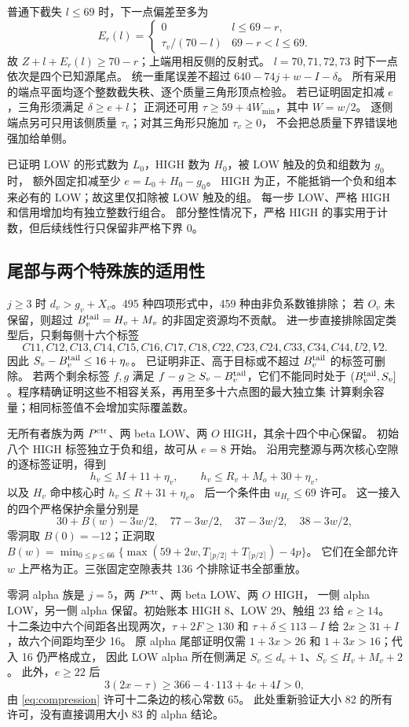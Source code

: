 \documentclass[11pt,a4paper]{article}
\begin{document}
普通下截失 $l\le69$ 时，下一点偏差至多为
\[
 E_r(l)=\begin{cases}0&l\le69-r,\\\tau_v/(70-l)&69-r<l\le69.\end{cases}
\]
故 $Z+l+E_r(l)\ge70-r$；上端用相反侧的反射式。
$l=70,71,72,73$ 时下一点依次是四个已知源尾点。
统一重尾误差不超过 $640-74j+w-I-\delta$。
所有采用的端点平面均逐个整数截失秩、逐个质量三角形顶点检验。
若已证明固定扣减 $e$，三角形须满足 $\delta\ge e+l$；
正洞还可用 $\tau\ge59+4W_{\min}$，其中 $W=w/2$。
逐侧端点另可只用该侧质量 $\tau_v$；对其三角形只施加 $\tau_v\ge0$，
不会把总质量下界错误地强加给单侧。

已证明 LOW 的形式数为 $L_0$，HIGH 数为 $H_0$，被 LOW 触及的负和组数为 $g_0$ 时，
额外固定扣减至少 $e=L_0+H_0-g_0$。
HIGH 为正，不能抵销一个负和组本来必有的 LOW；故这里仅扣除被 LOW 触及的组。
每一步 LOW、严格 HIGH 和信用增加均有独立整数行组合。
部分整性情况下，严格 HIGH 的事实用于计数，但后续线性行只保留非严格下界 0。

\subsection{尾部与两个特殊族的适用性}
$j\ge3$ 时 $d_v>g_v+X_v$。495 种四项形式中，459 种由非负系数锥排除；
若 $O_v$ 未保留，则超过 $B_v^{\rm tail}=H_v+M_v$ 的非固定资源均不贡献。
进一步直接排除固定类型后，只剩每侧十六个标签
\[
 C11,C12,C13,C14,C15,C16,C17,C18,C22,C23,C24,C33,C34,C44,U2,V2.
\]
因此 $S_v-B_v^{\rm tail}\le16+\eta_v$。
已证明非正、高于目标或不超过 $B_v^{\rm tail}$ 的标签可删除。
若两个剩余标签 $f,g$ 满足 $f-g\ge S_v-B_v^{\rm tail}$，它们不能同时处于
$(B_v^{\rm tail},S_v]$。程序精确证明这些不相容关系，再用至多十六点图的最大独立集
计算剩余容量；相同标签值不会增加实际覆盖数。

无所有者族为两 $P^{\rm ctr}$、两 beta LOW、两 $O$ HIGH，其余十四个中心保留。
初始八个 HIGH 标签独立于负和组，故可从 $e=8$ 开始。
沿用完整源与两次核心空隙的逐标签证明，得到
\[
 h_v\le M+11+\eta_v,\qquad h_v\le R_v+M_o+30+\eta_v,
\]
以及 $H_v$ 命中核心时 $h_v\le R+31+\eta_v$。
后一个条件由 $u_{H_v}\le69$ 许可。
这一接入的四个严格保护余量分别是
\[
 30+B(w)-3w/2,\quad77-3w/2,\quad37-3w/2,\quad38-3w/2,
\]
零洞取 $B(0)=-12$；正洞取
$B(w)=\min_{0\le p\le66}\{\max(59+2w,T_{\lfloor p/2\rfloor}+T_{\lceil p/2\rceil})-4p\}$。
它们在全部允许 $w$ 上严格为正。三张固定空隙表共 136 个排除证书全部重放。

零洞 alpha 族是 $j=5$，两 $P^{\rm ctr}$、两 beta LOW、两 $O$ HIGH，
一侧 alpha LOW，另一侧 alpha 保留。初始账本 HIGH 8、LOW 29、触组 23 给 $e\ge14$。
十二条边中六个间距各出现两次，$\tau+2F\ge130$ 和 $\tau+\delta\le113-I$ 给
$2x\ge31+I$，故六个间距均至少 16。
原 alpha 尾部证明仅需 $1+3x>26$ 和 $1+3x>16$；代入 16 仍严格成立，
因此 LOW alpha 所在侧满足 $S_v\le d_v+1$、$S_v\le H_v+M_v+2$。
此外，$e\ge22$ 后
\[
 3(2x-\tau)\ge366-4\cdot113+4e+4I>0,
\]
由 \eqref{eq:compression} 许可十二条边的核心常数 65。
此处重新验证大小 82 的所有许可，没有直接调用大小 83 的 alpha 结论。
\end{document}
